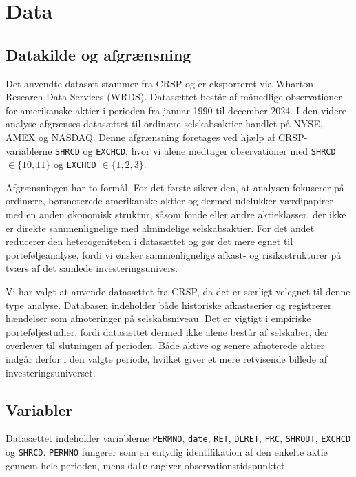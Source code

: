 \documentclass[../main.tex]{subfiles}
\begin{document}
\section{Data}

\subsection{Datakilde og afgrænsning}

Det anvendte datasæt stammer fra CRSP og er eksporteret via Wharton Research Data Services (WRDS). Datasættet består af månedlige observationer for amerikanske aktier i perioden fra januar 1990 til december 2024. I den videre analyse afgrænses datasættet til ordinære selskabsaktier handlet på NYSE, AMEX og NASDAQ. Denne afgrænsning foretages ved hjælp af CRSP-variablerne \texttt{SHRCD} og \texttt{EXCHCD}, hvor vi alene medtager observationer med \texttt{SHRCD} $\in \{10,11\}$ og \texttt{EXCHCD} $\in \{1,2,3\}$.

Afgrænsningen har to formål. For det første sikrer den, at analysen fokuserer på ordinære, børsnoterede amerikanske aktier og dermed udelukker værdipapirer med en anden økonomisk struktur, såsom fonde eller andre aktieklasser, der ikke er direkte sammenlignelige med almindelige selskabsaktier. For det andet reducerer den heterogeniteten i datasættet og gør det mere egnet til porteføljeanalyse, fordi vi ønsker sammenlignelige afkast- og risikostrukturer på tværs af det samlede investeringsunivers.

Vi har valgt at anvende datasættet fra CRSP, da det er særligt velegnet til denne type analyse. Databasen indeholder både historiske afkastserier og registrerer hændelser som afnoteringer på selskabsniveau. Det er vigtigt i empiriske porteføljestudier, fordi datasættet dermed ikke alene består af selskaber, der overlever til slutningen af perioden. Både aktive og senere afnoterede aktier indgår derfor i den valgte periode, hvilket giver et mere retvisende billede af investeringsuniverset.

\subsection{Variabler}

Datasættet indeholder variablerne \texttt{PERMNO}, \texttt{date}, \texttt{RET}, \texttt{DLRET}, \texttt{PRC}, \texttt{SHROUT}, \texttt{EXCHCD} og \texttt{SHRCD}. \texttt{PERMNO} fungerer som en entydig identifikation af den enkelte aktie gennem hele perioden, mens \texttt{date} angiver observationstidspunktet.
\end{document}
